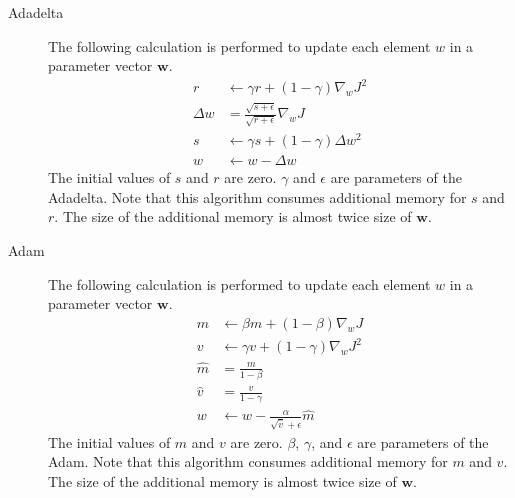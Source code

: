 \documentclass[a4paper]{report}
\newcommand{\bvec}[1]{\boldsymbol{#1}}
\newcommand{\vw}{\bvec{w}}
\begin{document}
\begin{description}
	\item[Adadelta]
	The following calculation is performed to update each element $w$ in a parameter vector $\vw$.
\begin{align}
r &\leftarrow \gamma r + (1 - \gamma)  \nabla_{w} J^2  \nonumber \\
\Delta w &= \frac{\sqrt{s + \epsilon}}{\sqrt{r + \epsilon}} \nabla_{w} J \nonumber \\
s &\leftarrow \gamma s + (1 - \gamma)  \Delta w^2 \nonumber \\
w &\leftarrow w - \Delta w \label{eq:adadelta}
\end{align}
The initial values of $s$ and $r$ are zero.
$\gamma$ and $\epsilon$ are parameters of the Adadelta.
Note that this algorithm consumes additional memory for $s$ and $r$.
The size of the additional memory is almost twice size of $\vw$.
	\item[Adam]
	The following calculation is performed to update each element $w$ in a parameter vector $\vw$.
	\begin{align}
	m &\leftarrow \beta m + (1 - \beta) \nabla_{w} J \nonumber \\
	v &\leftarrow \gamma v + (1 - \gamma) \nabla_{w} J^2 \nonumber \\
	\hat{m} &= \frac{m}{1 - \beta} \nonumber \\
	\hat{v} &= \frac{v}{1 - \gamma} \nonumber \\
	w &\leftarrow w - \frac{\alpha}{\sqrt{\hat{v}} + \epsilon} \hat{m} \label{eq:adam}
	\end{align}	
	The initial values of $m$ and $v$ are zero.
	$\beta$, $\gamma$, and $\epsilon$ are parameters of the Adam.
	Note that this algorithm consumes additional memory for $m$ and $v$.
	The size of the additional memory is almost twice size of $\vw$.
\end{description}
\end{document}
